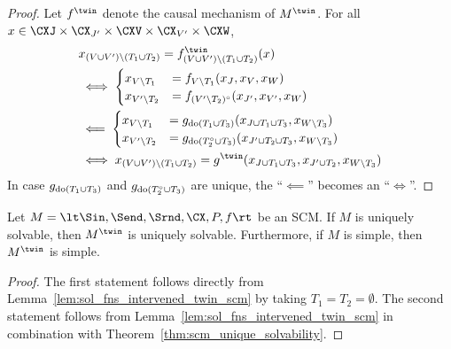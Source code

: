 \begin{proof}
Let $f^\twin$ denote the causal mechanism of $M^\twin$.
For all $x \in \CXJ \times \CX_{J'} \times \CXV \times \CX_{V'} \times \CXW$,
  \begin{equation*}\begin{split}
    & x_{(V \cup V') \setminus (T_1 \cup T_2)} = f^\twin_{(V \cup V') \setminus (T_1 \cup T_2)}(x) \\
    & \iff \begin{cases}
      x_{V\setminus T_1}  &= f_{V\setminus T_1}(x_J,x_V,x_W) \\
      x_{V'\setminus T_2} &= f_{(V'\setminus T_2)^\circ}(x_{J'},x_{V'},x_W)
    \end{cases} \\
    & \impliedby \begin{cases}
      x_{V\setminus T_1} &= g_{\doit(T_1\cup T_3)}(x_{J\cup T_1\cup T_3},x_{W\setminus T_3}) \\
      x_{V'\setminus T_2} &= g_{\doit(T_2^\circ \cup T_3)}(x_{J'\cup T_2 \cup T_3},x_{W\setminus T_3})
    \end{cases}\\
    & \iff 
    x_{(V \cup V') \setminus (T_1 \cup T_2)} = g^\twin(x_{J \cup T_1 \cup T_3}, x_{J' \cup T_2}, x_{W \setminus T_3})
  \end{split}\end{equation*}
In case $g_{\operatorname{do}(T_1 \cup T_3)}$ and $g_{\operatorname{do}(T_2^\circ \cup T_3)}$ are unique, the ``$\impliedby$'' becomes an ``$\iff$''.
\end{proof}
\begin{Prp}\label{prp:twin_scm_unique_solvability}
Let $M = \lt \Sin, \Send, \Srnd, \CX, P, f \rt$ be an SCM.
If $M$ is uniquely solvable, then $M^{\twin}$ is uniquely solvable.
Furthermore, if $M$ is simple, then $M^{\twin}$ is simple.
\end{Prp}
\begin{proof}
  The first statement follows directly from Lemma~\ref{lem:sol_fns_intervened_twin_scm} by taking $T_1 = T_2 = \emptyset$.
  The second statement follows from Lemma~\ref{lem:sol_fns_intervened_twin_scm} in combination with
  Theorem~\ref{thm:scm_unique_solvability}.
\end{proof}

